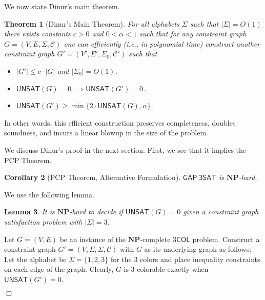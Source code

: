 \documentclass{article}
\newtheorem{theorem}{Theorem}
\newtheorem{example}[theorem]{Example}
\newtheorem{lemma}[theorem]{Lemma}
\newtheorem{corollary}[theorem]{Corollary}
\newenvironment{proof}{\noindent{\bf Proof:} \hspace*{1mm}}{
	\hspace*{\fill} $\Box$ }
\newcommand{\class}[1]{\mathbf{#1}}
\newcommand{\NP}{\class{NP}}
\newcommand{\COL}{\mathsf{COL}}
\newcommand{\UNSAT}{\mathsf{UNSAT}}
\newcommand{\GAPSAT}{\mathsf{GAP\;3SAT}}
\begin{document}

We now state Dinur's main theorem.

\begin{theorem}[Dinur's Main Theorem]\label{dinursthm}
For all alphabets $\Sigma$ such that $|\Sigma| = O(1)$ there exists constants $c > 0$ and
$0 < \alpha < 1$ such that for any constraint graph $G = (V, E, \Sigma, \mathcal{C})$
one can efficiently (i.e., in polynomial time) construct another constraint graph
$G' = (V', E', \Sigma_0, \mathcal{C}')$ such that
\begin{itemize}[leftmargin=10em]
\item[\textbf{(Linear blowup)}] $|G'| \le c \cdot |G|$ and $|\Sigma_0| = O(1)$.
\item[\textbf{(Completeness)}] $\UNSAT(G)=0 \implies \UNSAT(G')=0$.
\item[\textbf{(Soundness)}] $\UNSAT(G')\ge \min\{2\cdot\UNSAT(G), \alpha\}$.
\end{itemize}
\end{theorem}
In other words, this efficient construction preserves completeness, doubles
soundness, and incurs a linear blowup in the size of the problem.

We discuss Dinur's proof in the next section.
First, we see that it implies the PCP Theorem.

\begin{corollary}[PCP Theorem, Alternative Formulation]\label{corollary}
$\GAPSAT$ is $\NP$-hard.
\end{corollary}

We use the following lemma.

\begin{lemma}\label{csg-hard} It is $\NP$-hard to decide if $\UNSAT(G)=0$ given
a constraint graph satisfaction problem with $|\Sigma| = 3$.
\end{lemma}

\begin{proof}%
Let $G = (V,E)$ be an instance of the $\NP$-complete $3\COL$ problem.
Construct a constraint graph $G'=(V, E, \Sigma, \mathcal{C})$ with
$G$ as its underlying graph as follows:
Let the alphabet be $\Sigma = \{1, 2, 3\}$ for the 3 colors and place
inequality constraints on each edge of the graph.
Clearly, $G$ is 3-colorable exactly when $\UNSAT(G')=0$.
\end{proof}\\
\end{document}
